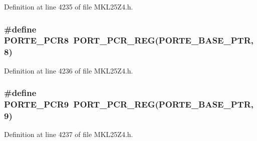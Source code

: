 Definition at line 4235 of file M\+K\+L25\+Z4.\+h.

\subsubsection[{\texorpdfstring{P\+O\+R\+T\+E\+\_\+\+P\+C\+R8}{PORTE_PCR8}}]{\setlength{\rightskip}{0pt plus 5cm}\#define P\+O\+R\+T\+E\+\_\+\+P\+C\+R8~{\bf P\+O\+R\+T\+\_\+\+P\+C\+R\+\_\+\+R\+EG}({\bf P\+O\+R\+T\+E\+\_\+\+B\+A\+S\+E\+\_\+\+P\+TR},8)}\hypertarget{group___p_o_r_t___register___accessor___macros_ga17d9629095af89dd3c23617ef086870f}{}\label{group___p_o_r_t___register___accessor___macros_ga17d9629095af89dd3c23617ef086870f}


Definition at line 4236 of file M\+K\+L25\+Z4.\+h.

\subsubsection[{\texorpdfstring{P\+O\+R\+T\+E\+\_\+\+P\+C\+R9}{PORTE_PCR9}}]{\setlength{\rightskip}{0pt plus 5cm}\#define P\+O\+R\+T\+E\+\_\+\+P\+C\+R9~{\bf P\+O\+R\+T\+\_\+\+P\+C\+R\+\_\+\+R\+EG}({\bf P\+O\+R\+T\+E\+\_\+\+B\+A\+S\+E\+\_\+\+P\+TR},9)}\hypertarget{group___p_o_r_t___register___accessor___macros_gae47d538d3ecb0ef5372a27da8ac06b02}{}\label{group___p_o_r_t___register___accessor___macros_gae47d538d3ecb0ef5372a27da8ac06b02}


Definition at line 4237 of file M\+K\+L25\+Z4.\+h.

